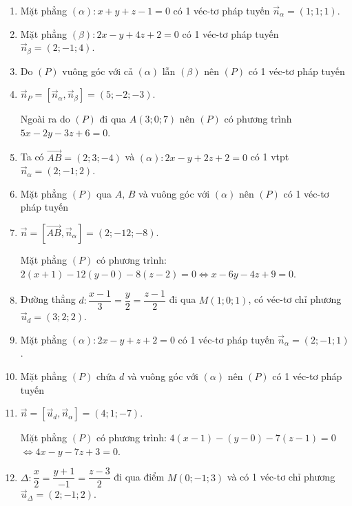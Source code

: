 \begin{vd}
{\begin{enumerate}
			\item Mặt phẳng $(\alpha)\colon x+y+z-1=0$ có 1 véc-tơ pháp tuyến $\overrightarrow{n}_{\alpha}=(1;1;1)$.\vspace{-0.1cm}
			\item[] Mặt phẳng $(\beta)\colon 2x-y+4z+2=0$ có 1 véc-tơ pháp tuyến $\overrightarrow{n}_{\beta}=(2;-1;4)$.\vspace{-0.1cm}
			\item[] Do $(P)$ vuông góc với cả $(\alpha)$ lẫn $(\beta)$ nên $(P)$ có 1 véc-tơ pháp tuyến
			\item[] \centerline{$\overrightarrow{n}_P=\left[\overrightarrow{n}_{\alpha},\overrightarrow{n}_{\beta}\right]=(5;-2;-3)$.}
			Ngoài ra do $(P)$ đi qua $A(3;0;7)$ nên $(P)$ có phương trình $5x-2y-3z+6=0$.
			\item Ta có $\overrightarrow{AB}=(2;3;-4)$ và $(\alpha)\colon 2x-y+2z+2=0$ có 1 vtpt $\overrightarrow{n}_{\alpha}=(2;-1;2)$.\vspace{-0.1cm}
			\item[] Mặt phẳng $(P)$ qua $A,\,B$ và vuông góc với $(\alpha)$ nên $(P)$ có 1 véc-tơ pháp tuyến
			\item[] \centerline{$\overrightarrow{n}=\left[\overrightarrow{AB},{\overrightarrow{n}}_{\alpha}\right] =(2;-12;-8)$.}\vspace{-0.1cm}
			Mặt phẳng $(P)$ có phương trình:
			$2(x+1)-12(y-0)-8(z-2)=0 \Leftrightarrow x-6y-4z+9=0$.\vspace{-0.2cm}
			\item Đường thẳng $d\colon \dfrac{x-1}{3}=\dfrac{y}{2}=\dfrac{z-1}{2}$ đi qua $M(1;0;1)$, có véc-tơ chỉ phương ${\overrightarrow{u}}_d=(3;2;2)$.\vspace{-0.4cm}
			\item[] Mặt phẳng $(\alpha)\colon 2x-y+z+2=0$ có 1 véc-tơ pháp tuyến $\overrightarrow{n}_{\alpha}=(2;-1;1)$.\vspace{-0.2cm}
			\item[] Mặt phẳng $(P)$ chứa $d$ và vuông góc với $(\alpha)$ nên $(P)$ có 1 véc-tơ pháp tuyến
			\item[] \centerline{$\overrightarrow{n}=\left[\overrightarrow{u}_d,\overrightarrow{n}_{\alpha}\right]=(4;1;-7)$.}
			Mặt phẳng $(P)$ có phương trình:
			$4(x-1)-(y-0)-7(z-1)=0$
			$ \Leftrightarrow 4x-y-7z+3=0$.
			\item $\Delta\colon\dfrac{x}{2}=\dfrac{y+1}{-1}=\dfrac{z-3}{2}$ đi qua điểm $M(0;-1;3)$ và có 1 véc-tơ chỉ phương $\overrightarrow{u}_{\Delta}=(2;-1;2)$.\\

\end{enumerate}}
\end{vd}
